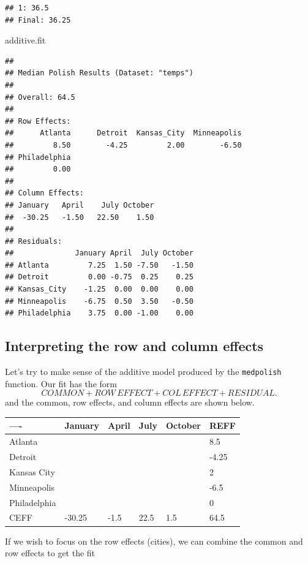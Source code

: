 \documentclass[
]{book}
\newenvironment{Shaded}{\begin{snugshade}}{\end{snugshade}}
\newcommand{\NormalTok}[1]{#1}
\begin{document}
\begin{verbatim}
## 1: 36.5
## Final: 36.25
\end{verbatim}

\begin{Shaded}
\begin{Highlighting}[]
\NormalTok{additive.fit}
\end{Highlighting}
\end{Shaded}

\begin{verbatim}
## 
## Median Polish Results (Dataset: "temps")
## 
## Overall: 64.5
## 
## Row Effects:
##      Atlanta      Detroit  Kansas_City  Minneapolis 
##         8.50        -4.25         2.00        -6.50 
## Philadelphia 
##         0.00 
## 
## Column Effects:
## January   April    July October 
##  -30.25   -1.50   22.50    1.50 
## 
## Residuals:
##              January April  July October
## Atlanta         7.25  1.50 -7.50   -1.50
## Detroit         0.00 -0.75  0.25    0.25
## Kansas_City    -1.25  0.00  0.00    0.00
## Minneapolis    -6.75  0.50  3.50   -0.50
## Philadelphia    3.75  0.00 -1.00    0.00
\end{verbatim}

\hypertarget{interpreting-the-row-and-column-effects}{%
\subsection{Interpreting the row and column effects}\label{interpreting-the-row-and-column-effects}}

Let's try to make sense of the additive model produced by the \texttt{medpolish} function. Our fit has the form
\[
COMMON + ROW \, EFFECT + COL \, EFFECT + RESIDUAL.
\]
and the common, row effects, and column effects are shown below.

\begin{longtable}[]{@{}llllll@{}}
\toprule
---- & January & April & July & October & REFF \\
\midrule
\endhead
Atlanta & & & & & 8.5 \\
Detroit & & & & & -4.25 \\
Kansas City & & & & & 2 \\
Minneapolis & & & & & -6.5 \\
Philadelphia & & & & & 0 \\
CEFF & -30.25 & -1.5 & 22.5 & 1.5 & 64.5 \\
\bottomrule
\end{longtable}

If we wish to focus on the row effects (cities), we can combine the common and row effects to get the fit
\end{document}
